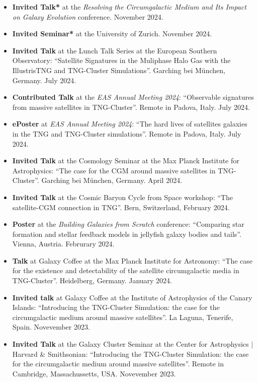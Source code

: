 \documentclass[a4paper,10pt,oneside]{article}
\begin{document}
\begin{itemize}[wide, labelwidth=!, labelindent=-11pt, parsep=0pt]
    \item {\bf Invited Talk*} at the {\it Resolving the Circumgalactic Medium and Its Impact on Galaxy Evolution} conference. November 2024.
    \item {\bf Invited Seminar*} at the University of Zurich. November 2024.
    \item {\bf Invited Talk} at the Lunch Talk Series at the European Southern Observatory: ``Satellite Signatures in the Muliphase Halo Gas with the IllustrisTNG and TNG-Cluster Simulations''. Garching bei M{\"u}nchen, Germany. July 2024.
    \item {\bf Contributed Talk} at the {\it EAS Annual Meeting 2024}: ``Observable signatures from massive satellites in TNG-Cluster''. Remote in Padova, Italy. July 2024.
    \item {\bf ePoster} at {\it EAS Annual Meeting 2024}: ``The hard lives of satellites galaxies in the TNG and TNG-Cluster simulations''. Remote in Padova, Italy. July 2024.
    \item {\bf Invited Talk} at the Cosmology Seminar at the Max Planck Institute for Astrophysics: ``The case for the CGM around massive satellites in TNG-Cluster''. Garching bei M{\"u}nchen, Germany. April 2024.
    \item {\bf Invited Talk} at the Cosmic Baryon Cycle from Space workshop: ``The satellite-CGM connection in TNG''. Bern, Switzerland, February 2024.
    \item {\bf Poster} at the {\it Building Galaxies from Scratch} conference: ``Comparing star formation and stellar feedback models in jellyfish galaxy bodies and tails''. Vienna, Austria. Februrary 2024.
    \item {\bf Talk} at Galaxy Coffee at the Max Planck Institute for Astronomy: ``The case for the existence and detectability of the satellite circumgalactic media in TNG-Cluster''. Heidelberg, Germany. January 2024.
    \item {\bf Invited talk} at Galaxy Coffee at the Institute of Astrophysics of the Canary Islands: ``Introducing the TNG-Cluster Simulation: the case for the circumgalactic medium around massive satellites''. La Laguna, Tenerife, Spain. Novevember 2023.
    \item {\bf Invited Talk} at the Galaxy Cluster Seminar at the Center for Astrophysics $\vert$ Harvard \& Smithsonian: ``Introducing the TNG-Cluster Simulation: the case for the circumgalactic medium around massive satellites''. Remote in Cambridge, Massachussetts, USA. Novevember 2023. 

\end{itemize}
\end{document}
